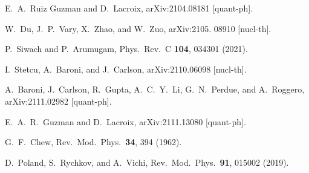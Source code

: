\documentclass[aps,prc,reprint,superscriptaddress,nofootinbib]{revtex4-2}
\begin{document}
\begin{thebibliography}{999}
E.~A.~Ruiz Guzman and D.~Lacroix,
arXiv:2104.08181 [quant-ph].

W.~Du, J.~P.~Vary, X.~Zhao, and W.~Zuo,
arXiv:2105. 08910 [nucl-th].

P.~Siwach and P.~Arumugam,
Phys.\ Rev.\ C \textbf{104}, 034301 (2021).

I.~Stetcu, A.~Baroni, and J.~Carlson,
arXiv:2110.06098 [nucl-th].

A.~Baroni, J.~Carlson, R.~Gupta, A.~C.~Y.~Li, G.~N.~Perdue, and A.~Roggero,
arXiv:2111.02982 [quant-ph].

E.~A.~R.~Guzman and D.~Lacroix,
arXiv:2111.13080 [quant-ph].

G.~F.~Chew,
Rev.\ Mod.\ Phys.\ {\bf 34}, 394 (1962).

D.~Poland, S.~Rychkov, and A.~Vichi,
Rev.\ Mod.\ Phys.\ \textbf{91}, 015002 (2019).

%


\end{thebibliography}
\end{document}
